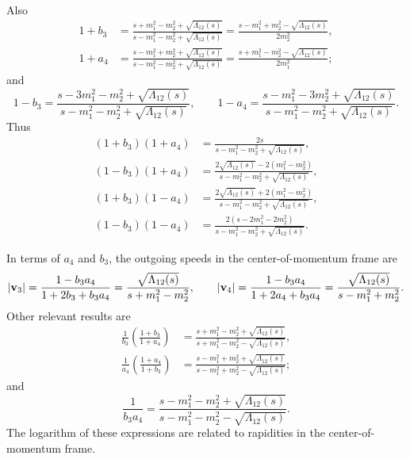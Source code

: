 Also
\begin{align}
	1 + b_{3} &= \frac{s + m_{1}^{2} - m_{2}^{2} + \sqrt{\Lambda_{12}(s)}}{s - m_{1}^{2} - m_{2}^{2} + \sqrt{\Lambda_{12}(s)}} = \frac{s - m_{1}^{2} + m_{2}^{2} - \sqrt{\Lambda_{12}(s)}}{2m_{2}^{2}}, \\
	1 + a_{4} &= \frac{s - m_{1}^{2} + m_{2}^{2} + \sqrt{\Lambda_{12}(s)}}{s - m_{1}^{2} - m_{2}^{2} + \sqrt{\Lambda_{12}(s)}} = \frac{s + m_{1}^{2} - m_{2}^{2} - \sqrt{\Lambda_{12}(s)}}{2m_{1}^{2}};
\end{align}
and
\begin{equation}
	1 - b_{3} = \frac{s - 3m_{1}^{2} - m_{2}^{2} + \sqrt{\Lambda_{12}(s)}}{s - m_{1}^{2} - m_{2}^{2} + \sqrt{\Lambda_{12}(s)}}, \qquad
	1 - a_{4} = \frac{s - m_{1}^{2} - 3m_{2}^{2} + \sqrt{\Lambda_{12}(s)}}{s - m_{1}^{2} - m_{2}^{2} + \sqrt{\Lambda_{12}(s)}}.
\end{equation}
Thus
\begin{align}
	\left( 1 + b_{3} \right) \left( 1 + a_{4} \right) &= \frac{2s}{s - m_{1}^{2} - m_{2}^{2} + \sqrt{\Lambda_{12}(s)}}, \\
	\left( 1 - b_{3} \right) \left( 1 + a_{4} \right) &= \frac{ 2 \sqrt{\Lambda_{12}(s)} - 2 \left( m_{1}^{2} - m_{2}^{2} \right)}{s - m_{1}^{2} - m_{2}^{2} + \sqrt{\Lambda_{12}(s)}}, \\
	\left( 1 + b_{3} \right) \left( 1 - a_{4} \right) &= \frac{ 2 \sqrt{\Lambda_{12}(s)} + 2 \left( m_{1}^{2} - m_{2}^{2} \right)}{s - m_{1}^{2} - m_{2}^{2} + \sqrt{\Lambda_{12}(s)}}, \\
	\left( 1 - b_{3} \right) \left( 1 - a_{4} \right) &= \frac{ 2 \left( s - 2m_{1}^{2} - 2m_{2}^{2} \right)}{s - m_{1}^{2} - m_{2}^{2} + \sqrt{\Lambda_{12}(s)}}.
\end{align}

In terms of $a_{4}$ and $b_{3}$, the outgoing speeds in the center-of-momentum frame are
\begin{equation}
	\left\lvert \mathbf{v}_{3} \right\rvert = \frac{1 - b_{3} a_{4}}{1 + 2 b_{3} + b_{3} a_{4}} = \frac{\sqrt{\Lambda_{12}(s)}}{s + m_{1}^{2} - m_{2}^{2}}, \qquad \left\lvert \mathbf{v}_{4} \right\rvert = \frac{1 - b_{3} a_{4}}{1 + 2 a_{4} + b_{3} a_{4}} = \frac{\sqrt{\Lambda_{12}(s)}}{s - m_{1}^{2} + m_{2}^{2}}.
\end{equation}
Other relevant results are
\begin{align}
	\frac{1}{b_{3}} \left( \frac{1 + b_{3}}{1 + a_{4}} \right) &= \frac{s + m_{1}^{2} - m_{2}^{2} + \sqrt{\Lambda_{12}(s)}}{s + m_{1}^{2} - m_{2}^{2} - \sqrt{\Lambda_{12}(s)}}, \\
	\frac{1}{a_{4}} \left( \frac{1 + a_{4}}{1 + b_{3}} \right) &= \frac{s - m_{1}^{2} + m_{2}^{2} + \sqrt{\Lambda_{12}(s)}}{s - m_{1}^{2} + m_{2}^{2} - \sqrt{\Lambda_{12}(s)}};
\end{align}
and
\begin{equation}
	\frac{1}{b_{3}a_{4}} = \frac{s - m_{1}^{2} - m_{2}^{2} + \sqrt{\Lambda_{12}(s)}}{s - m_{1}^{2} - m_{2}^{2} - \sqrt{\Lambda_{12}(s)}}.
\end{equation}
The logarithm of these expressions are related to rapidities in the center-of-momentum frame.

